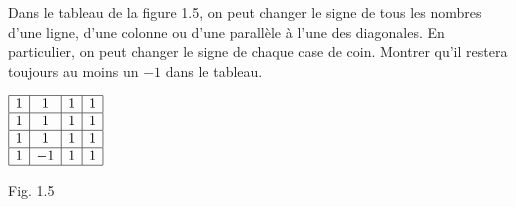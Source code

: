 Dans le tableau de la figure 1.5, on peut changer le signe de tous les nombres d'une ligne, d'une colonne ou d'une parallèle à l'une des diagonales. En particulier, on peut changer le signe de chaque case de coin. Montrer qu'il restera toujours au moins un $-1$ dans le tableau.
\begin{center}
$\begin{array}{|c|c|c|c|}\hline 1 & 1 & 1 & 1\\\hline 1 & 1 & 1 & 1\\\hline 1 & 1 & 1 & 1\\\hline 1 & -1 & 1 & 1\\\hline\end{array}$

Fig. 1.5
\end{center}
